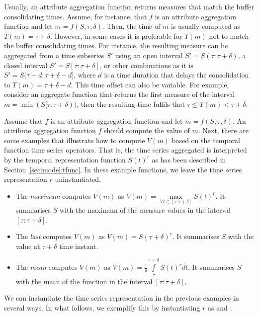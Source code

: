 Usually, an attribute aggregation function returns measures that match
the buffer consolidating times. Assume, for instance, that $f$ is an
attribute aggregation function and let $m=f(S,\tau,\delta)$.  Then,
the time of $m$ is usually computed as $T(m)=\tau+\delta$.  However,
in some cases it is preferable for $T(m)$ not to match the buffer
consolidating times. For instance, the resulting measure can be
aggregated from a time subseries $S'$ using an open interval
$S'=S(\tau:\tau+\delta)$, a closed interval $S'=S[\tau:\tau+\delta]$,
or other combinations as it is $S'=S(\tau-d:\tau+\delta-d]$, where $d$
is a time duration that delays the consolidation to
$T(m)=\tau+\delta-d$.  This time offset can also be variable. For
example, consider an aggregate function that returns the first measure
of the interval $m=\min(S[\tau:\tau+\delta))$, then the resulting time
fulfils that $\tau\leq T(m) < \tau+\delta$.

Assume that $f$ is an attribute aggregation function and let
$m=f(S,\tau,\delta)$.  An attribute aggregation function $f$ should
compute the value of $m$. Next, there are some examples that illustrate
how to compute $V(m)$ based on the temporal function time series
operators.  That is, the time series aggregated is interpreted by the
temporal representation function $S(t)^r$ as has been described in
Section~\ref{sec:model:tfunc}. In these example functions, we leave
the time series representation $r$ uninstantiated.

\begin{itemize}

\item The \emph{maximum} computes $V(m)$ as $V(m) =
  \max\limits_{\forall t \in [\tau:\tau+\delta]} S(t)^r$. It
  summarises $S$ with the maximum of the measure values in the
  interval $[\tau:\tau+\delta]$.

\item The \emph{last} computes $V(m)$ as $V(m) = S(\tau+\delta)^r$. It
  summarises $S$ with the value at $\tau+\delta$ time instant.

\item The \emph{mean} computes $V(m)$ as $V(m) = \frac{1}{\delta}
  \int\limits_{\tau}^{\tau+\delta} S(t)^r dt$. It summarises $S$ with
  the mean of the function in the interval $[\tau:\tau+\delta]$.

\end{itemize}

We can instantiate the time series representation in the previous
examples in several ways. In what follows, we exemplify this by
instantiating $r$ as \dd{} and \zohe{}.

